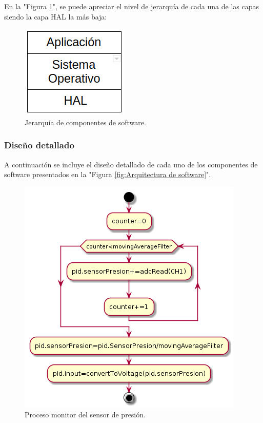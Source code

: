 En la "Figura \ref{fig:Capas de componentes de software}", se puede apreciar el nivel de jerarquía de cada una de las capas siendo la capa HAL la  más baja: 

\begin{figure}
\centering
\includegraphics[scale=.75]{./Figures/JerarquiaDeCapas-Software.png}
\caption{Jerarquía de componentes de software.}
\label{fig:Capas de componentes de software}
\end{figure}
\subsubsection{Diseño detallado}
A continuación se incluye el diseño detallado de cada uno de los componentes de software presentados en la "Figura \ref{fig:Arquitectura de software}".
	\begin{figure}
	\centering
	\includegraphics[scale=.65]{./Figures/Procesomonitorsensordepresion.png}
	\caption{Proceso monitor del sensor de presión.}
	\label{fig:Control servomotor}
	\end{figure}
	
